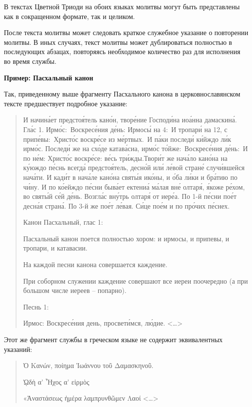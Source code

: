 \documentclass[
  letterpaper,
]{book}
\begin{document}
В текстах Цветной Триоди на обоих языках молитвы могут быть представлены
как в сокращенном формате, так и целиком.

После текста молитвы может следовать краткое служебное указание о
повторении молитвы. В иных случаях, текст молитвы может дублироваться
полностью в последующих абзацах, повторяясь необходимое количество раз
для исполнения во время службы.

\begin{tcolorbox}[enhanced jigsaw, toprule=.15mm, colframe=quarto-callout-tip-color-frame, colback=white, left=2mm, arc=.35mm, leftrule=.75mm, bottomrule=.15mm, rightrule=.15mm, opacityback=0, breakable]

\textbf{Пример: Пасхальный канон}\vspace{2mm}

Так, приведенному выше фрагменту Пасхального канона в церковнославянском
тексте предшествует подробное указание:

\begin{quote}
И начина́ет предстоя́тель кано́н, творе́ние Господи́на иоа́нна дамаскина́. Гла́с
1. Ирмо́с:~Воскресе́ния де́нь: Ирмосы́ на 4:~И тропари́ на 12, с
припе́вы:~Христо́с воскре́се из ме́ртвых.~И па́ки последи́ ки́йждо ли́к ирмо́с.
Последи́ же на схо́де катава́сиа, ирмо́с то́йже:~Воскресе́ния де́нь:~И по не́м:
Христо́с воскре́се: ве́сь три́жды.Твори́т же нача́ло кано́на на ку́юждо пе́снь
всегда́ предстоя́тель, десно́й или́ ле́вой стране́ случи́вшейся нача́ти. И кади́т
в нача́ле кано́на святы́я ико́ны, и о́ба ли́ки и бра́тию по чи́ну. И по ко́ейждо
пе́сни быва́ет ектениа́ ма́лая вне́ олтаря́, я́коже ре́хом, во святы́й се́й де́нь.
Возгла́с вну́трь олтаря́ от иере́а. По 1-й пе́сни пое́т десна́я страна́. По 3-й
же пое́т ле́вая. Си́це пое́м и по про́чих пе́снех.

Канон Пасхальный, глас 1:

Пасхальный канон поется полностью хором: и ирмосы, и припевы, и тропари,
и катавасии.

На каждой песни канона совершается каждение.

При соборном служении каждение совершают все иереи поочередно (а при
большом числе иереев -- попарно).

Песнь 1:

Ирмос: Воскресе́ния день, просвети́мся, лю́дие.
\textless\ldots\textgreater{}
\end{quote}

Этот же фрагмент службы в греческом языке не содержит эквивалентных
указаний:

\begin{quote}
Ὁ Κανών, ποίημα Ἰωάννου τοῦ Δαμασκηνοῦ.

ᾨδὴ α' Ἦχος α' εἱρμὸς

«Ἀναστάσεως ἡμέρα λαμπρυνθῶμεν Λαοί \textless\ldots\textgreater{}
\end{quote}

\end{tcolorbox}
\end{document}
